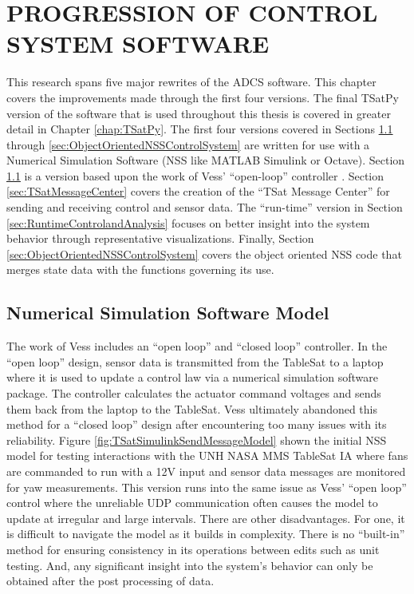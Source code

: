 
\chapter{PROGRESSION OF CONTROL SYSTEM SOFTWARE}
\label{chap:ProgressionOfControlSystemSoftware}

This research spans five major rewrites of the ADCS software.  This chapter covers the improvements made through the first four versions.  The final TSatPy version of the software that is used throughout this thesis is covered in greater detail in Chapter \ref{chap:TSatPy}.  The first four versions covered in Sections \ref{sec:NSSModel} through \ref{sec:ObjectOrientedNSSControlSystem} are written for use with a Numerical Simulation Software (NSS like MATLAB Simulink or Octave).  Section \ref{sec:NSSModel} is a version based upon the work of Vess' ``open-loop'' controller \cite{vessthesis}.  Section \ref{sec:TSatMessageCenter} covers the creation of the ``TSat Message Center'' for sending and receiving control and sensor data.  The ``run-time'' version in Section \ref{sec:RuntimeControlandAnalysis} focuses on better insight into the system behavior through representative visualizations.  Finally, Section \ref{sec:ObjectOrientedNSSControlSystem} covers the object oriented NSS code that merges state data with the functions governing its use.

\section{Numerical Simulation Software Model}
\label{sec:NSSModel}

The work of Vess \cite{vessthesis} includes an ``open loop'' and ``closed loop'' controller.  In the ``open loop'' design, sensor data is transmitted from the TableSat to a laptop where it is used to update a control law via a numerical simulation software package.  The controller calculates the actuator command voltages and sends them back from the laptop to the TableSat.  Vess ultimately abandoned this method for a ``closed loop'' design after encountering too many issues with its reliability.  Figure \ref{fig:TSatSimulinkSendMessageModel} shown the initial NSS model for testing interactions with the UNH NASA MMS TableSat IA where fans are commanded to run with a  12V input and sensor data messages are monitored for yaw measurements.  This version runs into the same issue as Vess' ``open loop'' control where the unreliable UDP communication often causes the model to update at irregular and large intervals.  There are other disadvantages.  For one, it is difficult to navigate the model as it builds in complexity.  There is no ``built-in'' method for ensuring consistency in its operations between edits such as unit testing.  And, any significant insight into the system's behavior can only be obtained after the post processing of data.

